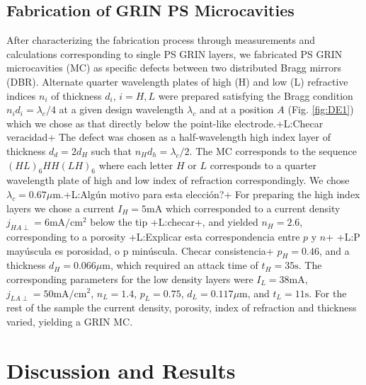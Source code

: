 \documentclass{article}
\newcommand{\notaL}[1]{{\color{blue}+L:#1+}}
\begin{document}
\subsection{Fabrication  of GRIN PS Microcavities}
\label{sec:fabrication-grin-ps}
After characterizing the fabrication process through measurements and
calculations corresponding to single PS GRIN layers, we
fabricated PS GRIN microcavities (MC) as specific defects between two distributed Bragg
mirrors  (DBR). Alternate quarter wavelength plates of high (H) and low (L)
refractive indices $n_i$ of thickness $d_i$, $i=H,L$ were prepared satisfying the Bragg condition
$n_id_i=\lambda_c/4$ at a given design
wavelength $\lambda_c$ and at a position $A$ (Fig. \ref{fig:DE1}) which
we chose as that directly below the point-like electrode.\notaL{Checar
  veracidad} The defect
was chosen as a half-wavelength high index layer of thickness $d_d=2d_H$ such that
$n_Hd_h=\lambda_c/2$. The MC corresponds to the
sequence $(HL)_6HH(LH )_6$ where each letter $H$ or $L$ corresponds to
a quarter wavelength plate of high and low index of refraction correspondingly.
We chose $\lambda_c= 0.67 \mu\text{m}$.\notaL{Algún motivo para esta
  elección?} For preparing the high index layers we
chose a current $I_H=5\text{mA}$ which corresponded to a current density
$j_{HA\perp}= 6\text{mA}/\text{cm}^2$ below the tip \notaL{checar}, and yielded
$n_H =2.6$, corresponding to a porosity \notaL{Explicar esta
  correspondencia entre $p$ y $n$} \notaL{P mayúscula
  es porosidad, o p minúscula. Checar consistencia} $p_H =0.46$, and a
thickness $d_H=0.066 \mu\text{m}$, which required an attack time of
$t_H=35 \text{s}$. The corresponding parameters for the low density
layers were $I_L=38\text{mA}$, $j_{LA\perp}=50\text{mA}/\text{cm}^2$, $n_L= 1.4$,  $p_L =0.75$,
$d_L=0.117 \mu \text{m}$, and $t_L=11 \text{s}$. For the rest of the
sample the current density, porosity, index of refraction and thickness
varied, yielding a GRIN MC.

\section{Discussion and Results}
\label{sec:discussion-results}
\end{document}
